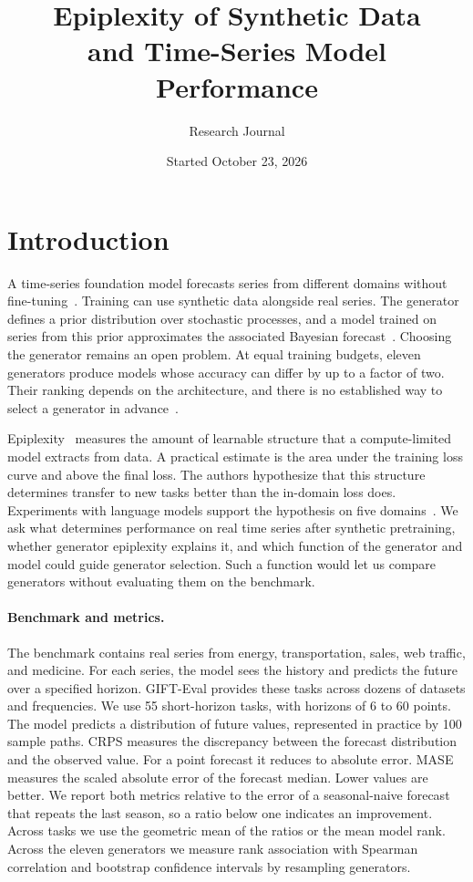 \documentclass[11pt]{article}
\title{\textbf{Epiplexity of Synthetic Data\\and Time-Series Model Performance}}
\author{Research Journal}
\date{Started October 23, 2026}
\begin{document}
\maketitle

\section{Introduction}

A time-series foundation model forecasts series from different domains without
fine-tuning~\citep{ansari2025chronos2}. Training can use synthetic data alongside real
series. The generator defines a prior distribution over stochastic processes, and a
model trained on series from this prior approximates the associated Bayesian
forecast~\citep{muller2022}. Choosing the generator remains an open problem. At equal
training budgets, eleven generators produce models whose accuracy can differ by up to
a factor of two. Their ranking depends on the architecture, and there is no established
way to select a generator in advance~\citep{nagpal2026}.

Epiplexity~\citep{finzi2026} measures the amount of learnable structure that a
compute-limited model extracts from data. A practical estimate is the area under the
training loss curve and above the final loss. The authors hypothesize that this
structure determines transfer to new tasks better than the in-domain loss does.
Experiments with language models support the hypothesis on five domains~\citep{su2026}.
We ask what determines performance on real time series after synthetic pretraining,
whether generator epiplexity explains it, and which function of the generator and model
could guide generator selection. Such a function would let us compare generators
without evaluating them on the benchmark.

\paragraph{Benchmark and metrics.} The benchmark contains real series from energy,
transportation, sales, web traffic, and medicine. For each series, the model sees the
history and predicts the future over a specified horizon. GIFT-Eval provides these tasks
across dozens of datasets and frequencies. We use 55 short-horizon tasks, with horizons
of 6 to 60 points. The model predicts a distribution of future values, represented in
practice by 100 sample paths. CRPS measures the discrepancy between the forecast
distribution and the observed value. For a point forecast it reduces to absolute error.
MASE measures the scaled absolute error of the forecast median. Lower values are better.
We report both metrics relative to the error of a seasonal-naive forecast that repeats
the last season, so a ratio below one indicates an improvement. Across tasks we use
the geometric mean of the ratios or the mean model rank. Across the eleven generators
we measure rank association with Spearman correlation and bootstrap confidence intervals
by resampling generators.
\end{document}
